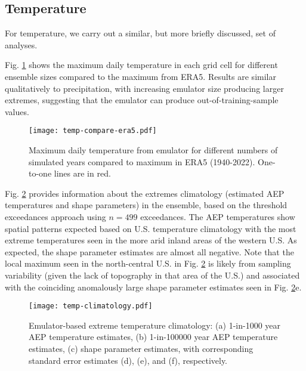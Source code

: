 \documentclass{ametsocV6.1}
\begin{document}
\subsection{Temperature}

For temperature, we carry out a similar, but more briefly discussed, set of analyses.

Fig. \ref{fig:temp-maxes} shows the maximum daily temperature in each grid cell for different ensemble sizes compared to the maximum from ERA5. Results are similar qualitatively to precipitation, with increasing emulator size producing larger extremes, suggesting that the emulator can produce out-of-training-sample values. %

\begin{figure}
    \centering
    \texttt{[image: temp-compare-era5.pdf]}
    \caption{Maximum daily temperature from emulator for different numbers of simulated years compared to maximum in ERA5 (1940-2022). One-to-one lines are in red.}
    \label{fig:temp-maxes}
\end{figure}

Fig. \ref{fig:temp-climate} provides information about the extremes climatology (estimated AEP temperatures and shape parameters) in the ensemble, based on the threshold exceedances approach using $n=499$ exceedances. The AEP temperatures show spatial patterns expected based on U.S. temperature climatology with the most extreme temperatures seen in the more arid inland areas of the western U.S. As expected, the shape parameter estimates are almost all negative. Note that the local maximum seen in the north-central U.S. in Fig. \ref{fig:temp-climate} is likely from sampling variability (given the lack of topography in that area of the U.S.) and associated with the coinciding anomalously large shape parameter estimates seen in Fig. \ref{fig:temp-climate}e. 

\begin{figure}
    \centering
    \texttt{[image: temp-climatology.pdf]}
    \caption{Emulator-based extreme temperature climatology: (a) 1-in-1000 year AEP temperature estimates, (b) 1-in-100000 year AEP temperature estimates, (c) shape parameter estimates, with corresponding standard error estimates (d), (e), and (f), respectively.}
    \label{fig:temp-climate}
\end{figure}
\end{document}
